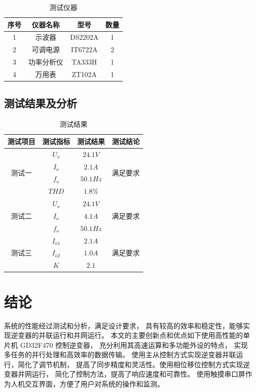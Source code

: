 \documentclass[a4paper,12pt]{article}
\begin{document}
\begin{table}[h]
    \centering
    \begin{tabular}{cccc}
    \toprule
    序号 & 仪器名称 & 型号 & 数量  \\ \midrule
    1 & 示波器 & DS2202A & 1\\
    2 & 可调电源 & IT6722A & 2 \\
    3 & 功率分析仪 & TA333H & 1 \\
    4 & 万用表 &  ZT102A & 1
    \\ \bottomrule
    \end{tabular}
    \caption{测试仪器}
\end{table}

\subsection{测试结果及分析}
\begin{table}
    \centering
    \begin{tabular}{@{}cccc@{}}
    \toprule
    测试项目 & 测试指标 & 测试结果 & 测试结论 \\ \midrule
    \multirow{4}{*}{测试一} & $U_o$ & $24.1V$ & \multirow{4}{*}{满足要求} \\
     & $I_o$ & $2.1A$ &  \\
     & $f_o$ & $50.1Hz$ &  \\
     & $THD$ & $1.8\%$ &  \\ \midrule
    \multirow{3}{*}{测试二} & $U_o$ & $24.1V$ & \multirow{3}{*}{满足要求} \\
        & $I_o$ & $4.1A$ &  \\
        & $f_o$ & $50.1Hz$ &  \\ \midrule
    \multirow{3}{*}{测试三} & $I_{o1}$ & $2.1A$ & \multirow{3}{*}{满足要求} \\
        & $I_{o2}$ & $1.0A$ &  \\
        & $K$ & $2.1$ &  \\ \bottomrule
    \end{tabular}
    \caption{测试结果}
\end{table}
\newpage
\section{结论}
系统的性能经过测试和分析，满足设计要求，
具有较高的效率和稳定性，能够实现逆变器的并联运行和并网运行。
本文的主要创新点和优点如下使用高性能的单片机 GD32F470 控制逆变器，
充分利用其高速运算和多功能外设的特点，
实现多任务的并行处理和高效率的数据传输。
使用主从控制方式实现逆变器并联运行，简化了调节机制，
提高了同步精度和灵活性。使用相位移位控制方式实现逆变器并网运行，
简化了控制方法，提高了响应速度和可靠性。
使用触摸串口屏作为人机交互界面，方便了用户对系统的操作和监测。
\end{document}
